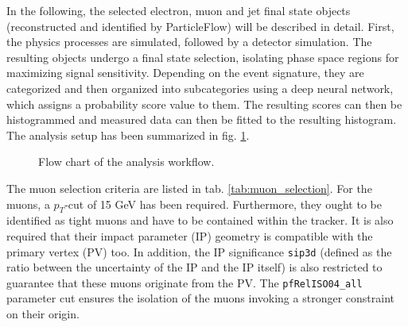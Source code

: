 
In the following, the selected electron, muon and jet final state objects (reconstructed and identified by ParticleFlow) will be described in detail. First, the physics processes are simulated, followed by a detector simulation. The resulting objects undergo a final state selection, isolating phase space regions for maximizing signal sensitivity. Depending on the event signature, they are categorized and then organized into subcategories using a deep neural network, which assigns a probability score value to them. The resulting scores can then be histogrammed and measured data can then be fitted to the resulting histogram. The analysis setup has been summarized in fig. \ref{fig:analysis_workflow}.

\begin{figure}[h!]
	\centering
	\caption{Flow chart of the analysis workflow.}
	\label{fig:analysis_workflow}
\end{figure}


The muon selection criteria are listed in tab. \ref{tab:muon_selection}. For the muons, a $p_T$-cut of 15 GeV has been required. Furthermore, they ought to be identified as tight muons and have to be contained within the tracker. It is also required that their impact parameter (IP) geometry is compatible with the primary vertex (PV) too. In addition, the IP significance \texttt{sip3d} (defined as the ratio between the uncertainty of the IP and the IP itself) is also restricted to guarantee that these muons originate from the PV. The \texttt{pfRelISO04\_all} parameter cut ensures the isolation of the muons invoking a stronger constraint on their origin.

